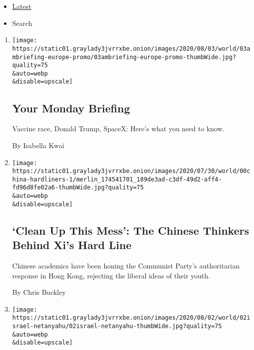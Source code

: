 \begin{itemize}
\tightlist
\item
  \protect\hyperlink{stream-panel}{Latest}
\item
  Search
\end{itemize}

\begin{enumerate}
\def\labelenumi{\arabic{enumi}.}
\item
  \href{/2020/08/02/briefing/vaccine-race-donald-trump-spacex.html}{}

  \texttt{[image: https://static01.graylady3jvrrxbe.onion/images/2020/08/03/world/03ambriefing-europe-promo/03ambriefing-europe-promo-thumbWide.jpg?quality=75\\\&auto=webp\\\&disable=upscale]}

  \hypertarget{your-monday-briefing}{%
  \subsection{Your Monday Briefing}\label{your-monday-briefing}}

  Vaccine race, Donald Trump, SpaceX: Here's what you need to know.

  By Isabella Kwai
\item
  \href{/2020/08/02/world/asia/china-hong-kong-national-security-law.html}{}

  \texttt{[image: https://static01.graylady3jvrrxbe.onion/images/2020/07/30/world/00china-hardliners-1/merlin\_174541701\_189de3ad-c3df-49d2-aff4-fd96d8fe02a6-thumbWide.jpg?quality=75\\\&auto=webp\\\&disable=upscale]}

  \hypertarget{clean-up-this-mess-the-chinese-thinkers-behind-xis-hard-line}{%
  \subsection{`Clean Up This Mess': The Chinese Thinkers Behind Xi's
  Hard
  Line}\label{clean-up-this-mess-the-chinese-thinkers-behind-xis-hard-line}}

  Chinese academics have been honing the Communist Party's authoritarian
  response in Hong Kong, rejecting the liberal ideas of their youth.

  By Chris Buckley
\item
  \href{/2020/08/02/world/middleeast/israel-Netanyahus-son-tweets.html}{}

  \texttt{[image: https://static01.graylady3jvrrxbe.onion/images/2020/08/02/world/02israel-netanyahu/02israel-netanyahu-thumbWide.jpg?quality=75\\\&auto=webp\\\&disable=upscale]}


\end{enumerate}
